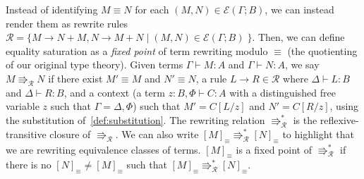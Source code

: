 \begin{example}
  Instead of identifying $M \equiv N$ for each $(M,N) \in \mathcal{E}(\Gamma; B)$, we can instead render them as rewrite rules $\mathcal{R} =\{ M \to N + M, N \to M + N \; | \; (M,N) \in \mathcal{E}(\Gamma; B) \; \}$.
  Then, we can define equality saturation as a \emph{fixed point} of term rewriting modulo $\equiv$ (the quotienting of our original type theory).
  Given terms $\Gamma \vdash M : A$ and $\Gamma \vdash N : A$, we say $M \Rrightarrow_{\mathcal{R}} N$ if there exist $M' \equiv M$ and $N' \equiv N$, a rule $L \to R \in \mathcal{R}$ where $\Delta \vdash L : B$ and $\Delta \vdash R : B$, and a context (a term $z : B, \Phi \vdash C : A$ with a distinguished free variable $z$ such that $\Gamma = \Delta, \Phi$) such that $M' = C[L/z]$ and $N' = C[R/z]$, using the substitution of~\autoref{def:substitution}.
  The rewriting relation $\Rrightarrow_{\mathcal{R}}^{*}$ is the reflexive-transitive closure of $\Rrightarrow_{\mathcal{R}}$.
  We can also write $[M]_{\equiv} \Rrightarrow_{\mathcal{R}}^{*} [N]_{\equiv}$ to highlight that we are rewriting equivalence classes of terms.
  $[M]_{\equiv}$ is a fixed point of $\Rrightarrow_{\mathcal{R}}^{*}$ if there is no $[N]_{\equiv} \not = [M]_{\equiv}$ such that $[M]_{\equiv} \Rrightarrow_{\mathcal{R}}^{*} [N]_{\equiv}$.
\end{example}

